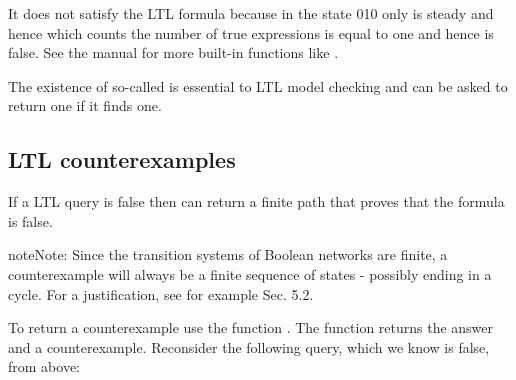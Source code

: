 \documentclass[letterpaper,10pt,english]{sphinxmanual}
\begin{document}
It does not satisfy the LTL formula because in the state 010 only  is steady and
hence  which counts the number of true expressions is equal to one and hence  is false.
See the {\hyperref[\detokenize{Installation:installation-nusmv}]{}} manual for more built-in functions like .

The existence of so-called  is essential to LTL model checking
and {\hyperref[\detokenize{Installation:installation-nusmv}]{}} can be asked to return one if it finds one.


\subsection{LTL counterexamples}
\label{\detokenize{Manual:ltl-counterexamples}}
If a LTL query is false then {\hyperref[\detokenize{Installation:installation-nusmv}]{}} can return a finite path that proves that the formula is false.

\begin{sphinxadmonition}{note}{Note:}
Since the transition systems of Boolean networks are finite, a counterexample will always be a finite sequence of states -
possibly ending in a cycle.
For a justification, see for example {\hyperref[\detokenize{Bibliography:baier2008}]{}} Sec. 5.2.
\end{sphinxadmonition}

To return a counterexample use the function {\hyperref[\detokenize{ModelChecking:check-primes-with-counterexample}]{}}.
The function returns the answer and a counterexample.
Reconsider the following query, which we know is false, from above:

\begin{sphinxVerbatim}[commandchars=\\\{\}]
  
  
\end{sphinxVerbatim}
\end{document}
